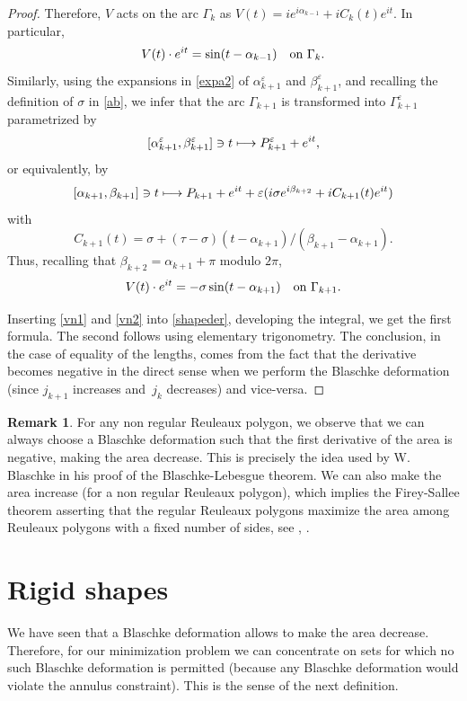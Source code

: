 \documentclass[JEP,XML,SOM,Unicode,NoFloatCountersInSection]{cedram}
\newcommand\mto{\mathchoice{\longmapsto}{\mapsto}{\mapsto}{\mapsto}}
\let\epsilon\varepsilon
\theoremstyle{plain}
\theoremstyle{definition}
\newtheorem{remark}[theorem]{Remark}
\let \e\epsilon
\let\B\Gamma
\begin{document}
\begin{proof}
Therefore, $V$ acts on the arc $\B_k$ as $V(t)= i e^{i\alpha_{k-1}} + i C_k(t)e^{it}$. In particular,
\begin{equation}\label{vn1}
V(t)\cdot e^{it} = \sin(t-\alpha_{k-1}) \quad \hbox{on }\B_{k}.
\end{equation}
Similarly, using the expansions in \eqref{expa2} of $\alpha_{k+1}^\e$ and $\beta_{k+1}^\e$, and recalling the definition of $\sigma$ in \eqref{ab}, we infer that the arc $\B_{k+1}$ is transformed into $\B_{k+1}^\e$ {parametrized by}
\[
[\alpha_{k+1}^\e,\beta_{k+1}^\e] \ni t \mto P_{k+1}^\e + e^{it},
\]
{or equivalently, by}
\[
[\alpha_{k+1},\beta_{k+1}] \ni t \mto P_ {k+1} + e^{it} + \e (i \sigma e^{i \beta_{k+2}} + i C_{k+1}(t)e^{it})
\]
with
\[
C_{k+1}(t)= \sigma + (\tau-\sigma)(t-\alpha_{k+1})/(\beta_{k+1}-\alpha_{k+1}).
\]
Thus, recalling that $\beta_{k+2}=\alpha_{k+1}+\pi$ modulo $2\pi$,
\begin{equation}\label{vn2}
V(t)\cdot e^{it} =-\sigma \sin (t-\alpha_{k+1})\quad \hbox{on }\B_{k+1}.
\end{equation}

Inserting \eqref{vn1} and \eqref{vn2} into \eqref{shapeder}, developing the integral, we get the first formula. The second follows using elementary trigonometry. The conclusion, in
the case of equality of the lengths, comes from the fact that the derivative becomes negative
in the direct sense when we perform the Blaschke deformation (since $j_{k+1}$ increases
and~$j_k$ decreases) and vice-versa.
\end{proof}

\begin{remark} For any non regular Reuleaux polygon, we observe that
we can always choose a Blaschke deformation such that the first derivative of the area
is negative, making the area decrease. This is precisely
the idea used by W. Blaschke in his proof of the Blaschke-Lebesgue theorem. We can also
make the area increase (for a non regular Reuleaux polygon), which implies the Firey-Sallee
theorem asserting that the regular Reuleaux polygons maximize the area among Reuleaux polygons
with a fixed number of sides, see \cite{CG}, \cite{KM}.
\end{remark}

\section{Rigid shapes}\label{sec-rs}
We have seen that a Blaschke deformation allows to make the area decrease. Therefore,
for our minimization problem we can concentrate on sets for which no such Blaschke
deformation is
permitted (because any Blaschke deformation would violate the annulus constraint). This is the sense of the next definition.
\end{document}
